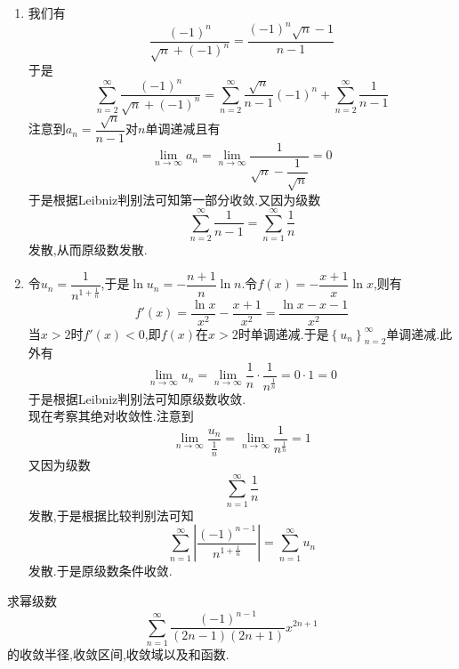 \documentclass{ctexart}
\begin{document}
\begin{solution}
    \begin{enumerate}[label=\tbf{(\arabic*)},topsep=0pt,parsep=0pt,itemsep=0pt,partopsep=0pt]
        \item 我们有
            \[\dfrac{(-1)^n}{\sqrt{n}+(-1)^n}=\dfrac{(-1)^n\sqrt{n}-1}{n-1}\]
            于是
            \[\sum_{n=2}^{\infty}\dfrac{(-1)^n}{\sqrt{n}+(-1)^n}
            =\sum_{n=2}^{\infty}\dfrac{\sqrt{n}}{n-1}(-1)^{n}+\sum_{n=2}^{\infty}\dfrac{1}{n-1}\]
            注意到$a_n=\dfrac{\sqrt{n}}{n-1}$对$n$单调递减且有
            \[\lim_{n\to\infty}a_n=\lim_{n\to\infty}\dfrac{1}{\sqrt{n}-\dfrac{1}{\sqrt{n}}}=0\]
            于是根据Leibniz判别法可知第一部分收敛.又因为级数
            \[\sum_{n=2}^{\infty}\dfrac{1}{n-1}=\sum_{n=1}^{\infty}\dfrac1n\]
            发散,从而原级数发散.
        \item 令$u_n=\dfrac{1}{n^{1+\frac1n}}$,于是$\ln u_n=-\dfrac{n+1}{n}\ln n$.令$f(x)=-\dfrac{x+1}{x}\ln x$,则有
            \[f'(x)=\dfrac{\ln x}{x^2}-\dfrac{x+1}{x^2}=\dfrac{\ln x-x-1}{x^2}\]
            当$x>2$时$f'(x)<0$,即$f(x)$在$x>2$时单调递减.于是$\left\{u_n\right\}_{n=2}^{\infty}$单调递减.此外有
            \[\lim_{n\to\infty}u_n=\lim_{n\to\infty}\dfrac{1}{n}\cdot\dfrac{1}{n^{\frac1n}}=0\cdot1=0\]
            于是根据Leibniz判别法可知原级数收敛.\\
            现在考察其绝对收敛性.注意到
            \[\lim_{n\to\infty}\dfrac{u_n}{\frac1n}=\lim_{n\to\infty}\dfrac{1}{n^{\frac1n}}=1\]
            又因为级数
            \[\sum_{n=1}^{\infty}\dfrac1n\]
            发散,于是根据比较判别法可知
            \[\sum_{n=1}^{\infty}\left|\dfrac{(-1)^{n-1}}{n^{1+\frac1n}}\right|=\sum_{n=1}^{\infty}u_n\]
            发散.于是原级数条件收敛.
    \end{enumerate}
\end{solution}
\begin{problem}[3.(16\songti{分})]
    求幂级数
    \[\sum_{n=1}^{\infty}\dfrac{(-1)^{n-1}}{(2n-1)(2n+1)}x^{2n+1}\]
    的收敛半径,收敛区间,收敛域以及和函数.

\end{problem}
\end{document}
